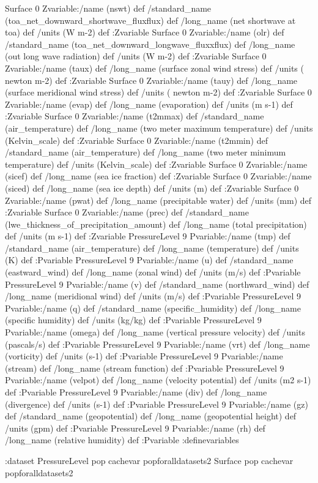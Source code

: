 \begin{ingrid}
Surface 0 Zvariable:/name (nswt) def /standard_name (toa_net_downward_shortwave_fluxflux) def /long_name (net shortwave at toa) def /units (W m-2) def :Zvariable
Surface 0 Zvariable:/name (olr) def /standard_name (toa_net_downward_longwave_fluxxflux) def /long_name (out long wave radiation) def /units (W m-2) def :Zvariable
Surface 0 Zvariable:/name (taux) def /long_name (surface zonal wind stress) def /units ( newton m-2) def :Zvariable
Surface 0 Zvariable:/name (tauy) def /long_name (surface meridional wind stress) def /units ( newton m-2) def :Zvariable
Surface 0 Zvariable:/name (evap) def /long_name (evaporation) def /units (m s-1) def :Zvariable
Surface 0 Zvariable:/name (t2mmax) def /standard_name (air_temperature) def /long_name (two meter maximum temperature) def /units (Kelvin_scale) def :Zvariable
Surface 0 Zvariable:/name (t2mmin) def /standard_name (air_temperature) def /long_name (two meter minimum temperature) def /units (Kelvin_scale) def :Zvariable
Surface 0 Zvariable:/name (sicef) def /long_name (sea ice fraction) def :Zvariable
Surface 0 Zvariable:/name (siced) def /long_name (sea ice depth) def /units (m) def :Zvariable
Surface 0 Zvariable:/name (pwat) def /long_name (precipitable water) def /units (mm) def :Zvariable
Surface 0 Zvariable:/name (prec) def /standard_name (lwe_thickness_of_precipitation_amount) def /long_name (total precipitation) def /units (m s-1) def :Zvariable
PressureLevel 9 Pvariable:/name (tmp) def /standard_name (air_temperature) def /long_name (temperature) def /units (K) def :Pvariable
PressureLevel 9 Pvariable:/name (u) def /standard_name (eastward_wind) def /long_name (zonal wind) def /units (m/s) def :Pvariable
PressureLevel 9 Pvariable:/name (v) def /standard_name (northward_wind) def /long_name (meridional wind) def /units (m/s) def :Pvariable
PressureLevel 9 Pvariable:/name (q) def /standard_name (specific_humidity) def /long_name (specific humidity)  def /units (kg/kg) def :Pvariable
PressureLevel 9 Pvariable:/name (omega) def /long_name (vertical pressure velocity)  def /units (pascals/s) def :Pvariable
PressureLevel 9 Pvariable:/name (vrt) def /long_name (vorticity)  def /units (s-1) def :Pvariable
PressureLevel 9 Pvariable:/name (stream) def /long_name (stream function) def :Pvariable
PressureLevel 9 Pvariable:/name (velpot) def /long_name (velocity potential) def /units (m2 s-1) def :Pvariable
PressureLevel 9 Pvariable:/name (div) def /long_name (divergence) def /units (s-1) def :Pvariable
PressureLevel 9 Pvariable:/name (gz) def /standard_name (geopotential) def /long_name (geopotential height) def /units (gpm) def :Pvariable
PressureLevel 9 Pvariable:/name (rh) def /long_name (relative humidity) def :Pvariable
:definevariables

:dataset
 PressureLevel {pop} {cachevar pop}foralldatasets2
 Surface {pop} {cachevar pop}foralldatasets2
\end{ingrid}



